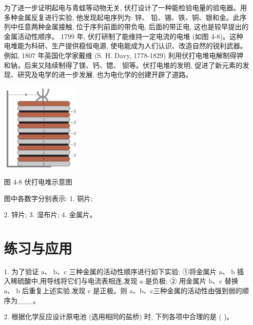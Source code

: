 \documentclass[10pt]{article}
\begin{document}
为了进一步证明起电与青蛙等动物无关, 伏打设计了一种能检验电量的验电器。用多种金属反复进行实验, 他发现起电序列为: 锌、 铅、锡、铁、铜、银和金。此序列中任意两种金属接触, 位于序列前面的带负电, 后面的带正电, 这也是较早提出的金属活动性顺序。 1799 年, 伏打研制了能维持一定电流的电堆 (如图 4-8)。这种电堆能为科研、生产提供稳恒电源, 使电能成为人们认识、改造自然的锐利武器。例如, 1807 年英国化学家戴维 (S. H. Davy, 1778-1829) 利用伏打电堆电解制得钾和钠，后来又陆续制得了镁、钙、锶、 钡等。伏打电堆的发明, 促进了新元素的发现、研究及电学的进一步发展, 也为电化学的创建开辟了道路。

\begin{center}
\includegraphics[max width=0.3\textwidth]{images/0190da9d-8bfd-732f-bc2c-0b21d0f13b91_107_483382.jpg}
\end{center}

图 4-8 伏打电堆示意图

图中各数字分别表示: 1. 铜片;

2. 锌片; 3. 湿布片; 4. 金属片。

\section*{练习与应用}

1. 为了验证 \(\mathrm{a}\text{、}\mathrm{\;b}\text{、}\mathrm{c}\) 三种金属的活动性顺序进行如下实验: ①将金属片 \(\mathrm{a}\text{、}\mathrm{\;b}\) 插入稀硫酸中,用导线将它们与电流表相连,发现 \(\mathrm{a}\) 是负极; ② 用金属片 \(\mathrm{b}\text{、}\mathrm{c}\) 替换 \(\mathrm{a}\text{、}\mathrm{\;b}\) 后重复上述实验,发现 \(\mathrm{c}\) 是正极。则 a、b、c三种金属的活动性由强到弱的顺序为\_\_\_。

2. 根据化学反应设计原电池 (选用相同的盐桥) 时, 下列各项中合理的是 ( )。

\begin{center}
\end{center}
\end{document}
